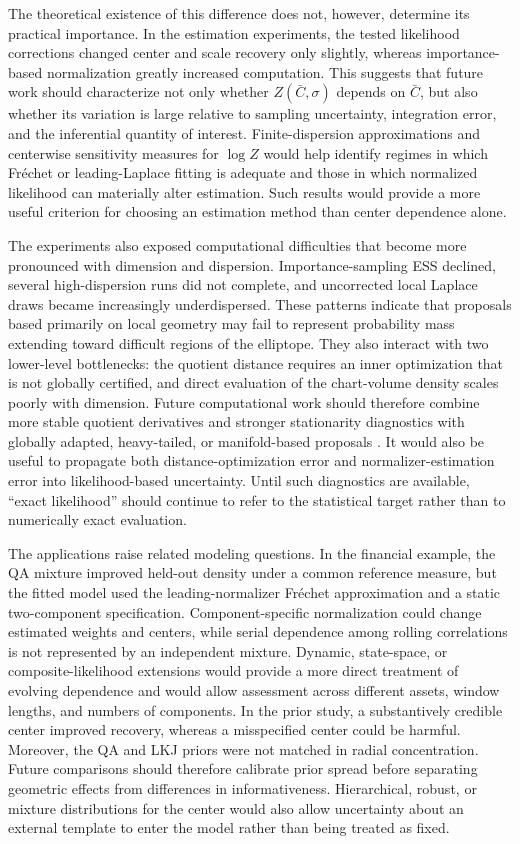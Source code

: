 \documentclass[
  12pt]{article}
\newcommand{\Frechet}{Fr\'{e}chet\xspace}
\begin{document}
The theoretical existence of this difference does not, however, determine its practical importance. In the estimation experiments, the tested likelihood corrections changed center and scale recovery only slightly, whereas importance-based normalization greatly increased computation. This suggests that future work should characterize not only whether $Z(\bar C,\sigma)$ depends on $\bar C$, but also whether its variation is large relative to sampling uncertainty, integration error, and the inferential quantity of interest. Finite-dispersion approximations and centerwise sensitivity measures for $\log Z$ would help identify regimes in which \Frechet or leading-Laplace fitting is adequate and those in which normalized likelihood can materially alter estimation. Such results would provide a more useful criterion for choosing an estimation method than center dependence alone.

The experiments also exposed computational difficulties that become more pronounced with dimension and dispersion. Importance-sampling ESS declined, several high-dispersion runs did not complete, and uncorrected local Laplace draws became increasingly underdispersed. These patterns indicate that proposals based primarily on local geometry may fail to represent probability mass extending toward difficult regions of the elliptope. They also interact with two lower-level bottlenecks: the quotient distance requires an inner optimization that is not globally certified, and direct evaluation of the chart-volume density scales poorly with dimension. Future computational work should therefore combine more stable quotient derivatives and stronger stationarity diagnostics with globally adapted, heavy-tailed, or manifold-based proposals \citep{girolami_2011_RiemannManifoldLangevin,byrne_2013_GeodesicMonteCarlo}. It would also be useful to propagate both distance-optimization error and normalizer-estimation error into likelihood-based uncertainty. Until such diagnostics are available, ``exact likelihood'' should continue to refer to the statistical target rather than to numerically exact evaluation.

The applications raise related modeling questions. In the financial example, the QA mixture improved held-out density under a common reference measure, but the fitted model used the leading-normalizer \Frechet approximation and a static two-component specification. Component-specific normalization could change estimated weights and centers, while serial dependence among rolling correlations is not represented by an independent mixture. Dynamic, state-space, or composite-likelihood extensions would provide a more direct treatment of evolving dependence and would allow assessment across different assets, window lengths, and numbers of components. In the prior study, a substantively credible center improved recovery, whereas a misspecified center could be harmful. Moreover, the QA and LKJ priors were not matched in radial concentration. Future comparisons should therefore calibrate prior spread before separating geometric effects from differences in informativeness. Hierarchical, robust, or mixture distributions for the center would also allow uncertainty about an external template to enter the model rather than being treated as fixed.
\end{document}
